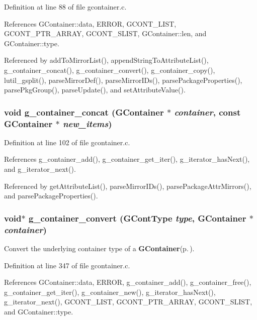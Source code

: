 Definition at line 88 of file gcontainer.c.

References GContainer::data, ERROR, GCONT\_\-LIST, GCONT\_\-PTR\_\-ARRAY, GCONT\_\-SLIST, GContainer::len, and GContainer::type.

Referenced by add\-To\-Mirror\-List(), append\-String\-To\-Attribute\-List(), g\_\-container\_\-concat(), g\_\-container\_\-convert(), g\_\-container\_\-copy(), lutil\_\-gsplit(), parse\-Mirror\-Def(), parse\-Mirror\-IDs(), parse\-Package\-Properties(), parse\-Pkg\-Group(), parse\-Update(), and set\-Attribute\-Value().
\subsubsection{\setlength{\rightskip}{0pt plus 5cm}void g\_\-container\_\-concat ({\bf GContainer} $\ast$ {\em container}, const {\bf GContainer} $\ast$ {\em new\_\-items})}\label{gcontainer_8h_a7}




Definition at line 102 of file gcontainer.c.

References g\_\-container\_\-add(), g\_\-container\_\-get\_\-iter(), g\_\-iterator\_\-has\-Next(), and g\_\-iterator\_\-next().

Referenced by get\-Attribute\-List(), parse\-Mirror\-IDs(), parse\-Package\-Attr\-Mirrors(), and parse\-Package\-Properties().
\subsubsection{\setlength{\rightskip}{0pt plus 5cm}void$\ast$ g\_\-container\_\-convert ({\bf GCont\-Type} {\em type}, {\bf GContainer} $\ast$ {\em container})}\label{gcontainer_8h_a22}


Convert the underlying container type of a {\bf GContainer}{\rm (p.\,\pageref{structGContainer})}. 



Definition at line 347 of file gcontainer.c.

References GContainer::data, ERROR, g\_\-container\_\-add(), g\_\-container\_\-free(), g\_\-container\_\-get\_\-iter(), g\_\-container\_\-new(), g\_\-iterator\_\-has\-Next(), g\_\-iterator\_\-next(), GCONT\_\-LIST, GCONT\_\-PTR\_\-ARRAY, GCONT\_\-SLIST, and GContainer::type.
